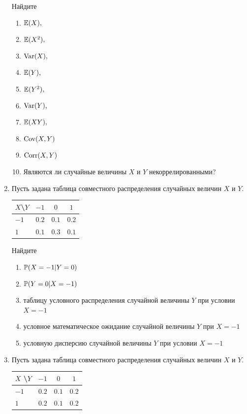 \begin{enumerate}
Найдите
\begin{enumerate}
    \item $\E(X),$
    \item $\E(X^{2}),$
	\item $\Var(X),$
    \item $\E(Y),$
    \item $\E(Y^{2}),$
    \item $\Var(Y),$
    \item $\E(XY),$
	\item $\Cov(X,Y)$
    \item $\Corr(X,Y)$
    \item Являются ли случайные величины $X$ и $Y$ некоррелированными?
\end{enumerate}

\item
Пусть задана таблица совместного распределения случайных величин $X$ и $Y$.

\begin{center}\begin{tabular}{lccc}
\toprule
 $X$\textbackslash $Y$    & $-1$  & $0$   & $1$   \\ \midrule
$-1$                 & $0.2$ & $0.1$ & $0.2$ \\
 $1$                 & $0.1$ & $0.3$ & $0.1$ \\ \bottomrule
\end{tabular}\end{center}

Найдите
\begin{enumerate}
\item $\P(X = -1 | Y = 0)$
\item $\P(Y = 0 | X = -1)$
\item таблицу условного распределения случайной величины $Y$ при условии $X = -1$
\item условное математическое ожидание случайной величины $Y$ при $X = -1$
\item условную дисперсию случайной величины $Y$
при условии $X = -1$
\end{enumerate}

\item Пусть задана таблица совместного распределения случайных величин $X$ и $Y$.

\begin{center}\begin{tabular}{lccc}
\toprule
 $X$ \textbackslash $Y$    & $-1$  & $0$   & $1$   \\ \midrule
$-1$                 & $0.2$ & $0.1$ & $0.2$ \\
 $1$                 & $0.2$ & $0.1$ & $0.2$ \\ \bottomrule
\end{tabular}\end{center}


\end{enumerate}
